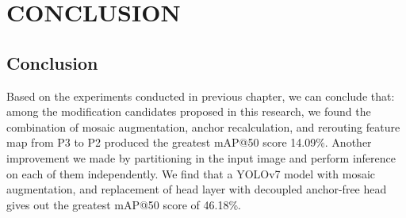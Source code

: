 \chapter{CONCLUSION}


\section{Conclusion}
\label{section:Conclusion}

Based on the experiments conducted in previous chapter, we can conclude that:
among the modification candidates proposed in this research, we found the combination
of mosaic augmentation, anchor recalculation, and rerouting feature map from P3 to P2
produced the greatest mAP@50 score 14.09\%. 
Another improvement we made by partitioning in the input image and perform inference 
on each of them independently. We find that a YOLOv7 model with mosaic augmentation,
and replacement of head layer with decoupled anchor-free head gives out the greatest
mAP@50 score of 46.18\%. 




